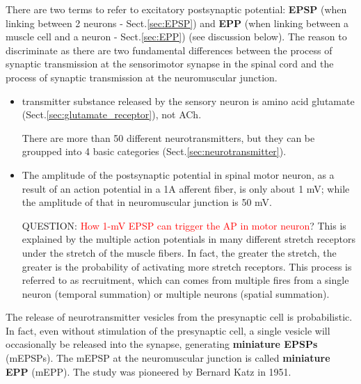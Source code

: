 There are two terms to refer to excitatory postsynaptic potential: {\bf EPSP}
(when linking between 2 neurons - Sect.\ref{sec:EPSP}) and {\bf EPP} (when
linking between a muscle cell and a neuron - Sect.\ref{sec:EPP}) (see discussion
below). The reason to discriminate as there are two fundamental differences
between the process of synaptic transmission at the sensorimotor synapse in the
spinal cord and the process of synaptic transmission at the neuromuscular
junction.
\begin{itemize}
  \item transmitter substance released by the sensory neuron is amino acid
  glutamate (Sect.\ref{sec:glutamate_receptor}), not ACh.
  
There are more than 50 different neurotransmitters, but they can be groupped
into 4 basic categories (Sect.\ref{sec:neurotransmitter}).

  \item The amplitude of the postsynaptic potential in spinal motor neuron, as a
  result of an action potential in a 1A afferent fiber, is only about 1 mV;
  while the amplitude of that in neuromuscular junction is 50 mV.
  
QUESTION: \textcolor{red}{How 1-mV EPSP can trigger the AP in motor neuron}?
This is explained by the multiple action potentials in many different stretch
receptors under the stretch of the muscle fibers.
In fact, the greater the stretch, the greater is the probability of activating
more stretch receptors. This process is referred to as recruitment, which can
comes from multiple fires from a single neuron (temporal summation) or multiple
neurons (spatial summation).
\end{itemize}

The release of neurotransmitter vesicles from the presynaptic cell is
probabilistic. In fact, even without stimulation of the presynaptic cell, a
single vesicle will occasionally be released into the synapse, generating
{\bf miniature EPSPs} (mEPSPs). The mEPSP at the neuromuscular junction is
called {\bf miniature EPP} (mEPP). The study was pioneered by
Bernard Katz in 1951.

